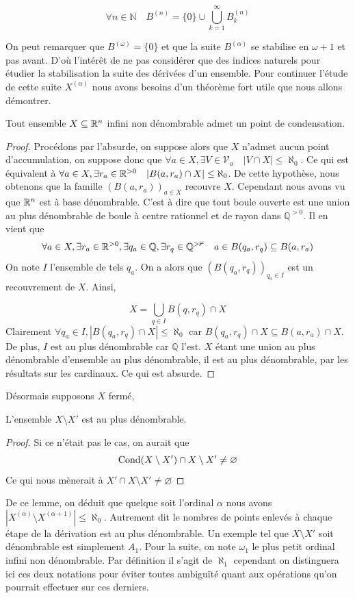 \[
\forall n\in \mathbb{N} \quad B^{(n)}=\{0\} \cup \bigcup_{k=1}^{\infty}B_k^{(n)}
\]

On peut remarquer que $B^{(\omega)}= \{0\}$ et que la suite $B^{(\alpha)}$ se stabilise en $\omega+1$ et pas avant. D'où l'intérêt de ne pas considérer que des indices naturels pour étudier la stabilisation la suite des dérivées d'un ensemble. Pour continuer l'étude de cette suite $X^{(\alpha)}$ nous avons besoins d'un théorème fort utile que nous allons démontrer.

\begin{theoreme}
    Tout ensemble $X\subseteq \mathbb{R}^n$ infini non dénombrable admet un point de condensation.
\end{theoreme}

\begin{proof}
    Procédons par l'absurde, on suppose alors que $X$ n'admet aucun point d'accumulation, on suppose donc que $\forall a\in X, \exists V\in \mathcal{V}_a\quad |V\cap X|\leq \aleph_0$. Ce qui est équivalent à $\forall a\in X, \exists r_a\in \mathbb{R}^{>0}\quad |B(a,r_a)\cap X|\leq \aleph_0$. De cette hypothèse, nous obtenons que la famille $(B(a,r_a))_{a\in X}$ recouvre $X$. Cependant nous avons vu que $\mathbb{R}^n$ est à base dénombrable. C'est à dire que tout boule ouverte est une union au plus dénombrable de boule à centre rationnel et de rayon dans $\mathbb{Q}^{>0}$. Il en vient que
    \[
    \forall a\in X, \exists r_a\in \mathbb{R}^{>0},  \exists q_a\in \mathbb Q, \exists r_q\in \mathbb{Q^{>0}} \quad a\in B(q_a,r_q)\subseteq B(a,r_a)
    \]
    On note $I$ l'ensemble de tels $q_a$. On a alors que $(B(q_a,r_q))_{q_a\in I}$ est un recouvrement de $X$. Ainsi,

    \[
    X= \bigcup_{q\in I}B(q,r_q)\cap X
    \]
    Clairement $\forall q_a\in I, |B(q_a,r_q)\cap X|\leq \aleph_0$ car $B(q_a,r_q)\cap X\subseteq B(a,r_a)\cap X$. De plus, $I$ est au plus dénombrable car $\mathbb Q$ l'est. $X$ étant une union au plus dénombrable d'ensemble au plus dénombrable, il est au plus dénombrable, par les résultats sur les cardinaux. Ce qui est absurde.
\end{proof}
\noindent Désormais supposons $X$ fermé,

\begin{lemme}
    L'ensemble $X\setminus X '$ est au plus dénombrable.
\end{lemme}

\begin{proof}
Si ce n'était pas le cas, on aurait que
\[
\operatorname{Cond}(X\setminus X')\cap X\setminus X'\neq \varnothing
\]
Ce qui nous mènerait à $X'\cap X\setminus X'\neq \varnothing$
\end{proof}
De ce lemme, on déduit que quelque soit l'ordinal $\alpha$ nous avons $|X^{(\alpha)}\setminus X^{(\alpha+1)}|\le \aleph_0$. Autrement dit le nombres de points enlevés à chaque étape de la dérivation est au plus dénombrable. Un exemple tel que $X\setminus X'$ soit dénombrable est simplement $A_1$. Pour la suite, on note $\omega_1$ le plus petit ordinal infini non dénombrable. Par définition il s'agit de $\aleph_1$ cependant on distinguera ici ces deux notations pour éviter toutes ambiguïté quant aux opérations qu'on pourrait effectuer sur ces derniers.

